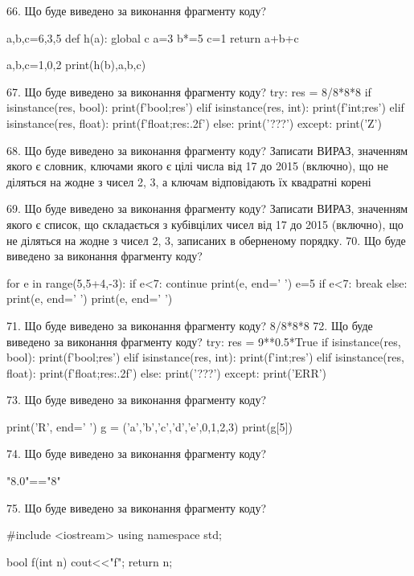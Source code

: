 \documentclass[11pt]{article}
\begin{document}
66. Що буде виведено за виконання фрагменту коду?

a,b,c=6,3,5
def h(a):
global c    a=3
    b*=5
    c=1
    return a+b+c

a,b,c=1,0,2
print(h(b),a,b,c)

67. Що буде виведено за виконання фрагменту коду?
try:
    res = 8/8*8*8
    if isinstance(res, bool):
        print(f'bool;{res}')
    elif isinstance(res, int):
        print(f'int;{res}')
    elif isinstance(res, float):
        print(f'float;{res:.2f}')
    else:
        print('???')
except:
    print('Z')

68. Що буде виведено за виконання фрагменту коду?
Записати ВИРАЗ, значенням якого є словник, ключами якого є цілі числа від 17 до 2015 (включно), що не діляться на жодне з чисел 2, 3, а ключам відповідають їх квадратні корені 

69. Що буде виведено за виконання фрагменту коду?
Записати ВИРАЗ, значенням якого є список, що складається з кубівцілих чисел від 17 до 2015 (включно), що не діляться на жодне з чисел 2, 3, записаних в оберненому порядку.
70. Що буде виведено за виконання фрагменту коду?

for e in range(5,5+4,-3):
    if e<7:
        continue
    print(e, end=' ')
    e=5
    if e<7:
        break
else:
    print(e, end=' ')
print(e, end=' ')

71. Що буде виведено за виконання фрагменту коду?
8/8*8*8
72. Що буде виведено за виконання фрагменту коду?
try:
    res = 9**0.5*True
    if isinstance(res, bool):
        print(f'bool;{res}')
    elif isinstance(res, int):
        print(f'int;{res}')
    elif isinstance(res, float):
        print(f'float;{res:.2f}')
    else:
        print('???')
except:
    print('ERR')

73. Що буде виведено за виконання фрагменту коду?

print('R', end=' ')
g = ('a','b','c','d','e',0,1,2,3)
print(g[5])


74. Що буде виведено за виконання фрагменту коду?

"8.0"=="8"

75. Що буде виведено за виконання фрагменту коду?

#include <iostream>
using namespace std;

bool f(int n){
    cout<<"f";
    return n;
}
\end{document}
